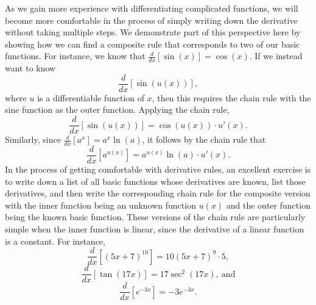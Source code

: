 As we gain more experience with differentiating complicated functions, we will become more comfortable in the process of simply writing down the derivative without taking multiple steps.  We demonstrate part of this perspective here by showing how we can find a composite rule that corresponds to two of our basic functions.  For instance, we know that $\frac{d}{dx}[\sin(x)] = \cos(x)$.  If we instead want to know
$$\frac{d}{dx}[\sin(u(x))],$$
where $u$ is a differentiable function of $x$, then this requires the chain rule with the sine function as the outer function.  Applying the chain rule,
$$\frac{d}{dx}[\sin(u(x))] = \cos(u(x)) \cdot u'(x).$$
Similarly, since $\frac{d}{dx}[a^x] = a^x \ln(a)$, it follows by the chain rule that 
$$\frac{d}{dx}[a^{u(x)}] = a^{u(x)} \ln(a) \cdot u'(x).$$
In the process of getting comfortable with derivative rules, an excellent exercise is to write down a list of all basic functions whose derivatives are known, list those derivatives, and then write the corresponding chain rule for the composite version with the inner function being an unknown function $u(x)$ and the outer function being the known basic function.  These versions of the chain rule are particularly simple when the inner function is linear, since the derivative of a linear function is a constant.  For instance,
$$\frac{d}{dx} \left[ (5x+7)^{10} \right] = 10(5x+7)^9 \cdot 5,$$
$$\frac{d}{dx} \left[ \tan(17x) \right] = 17\sec^2(17x), \ \mbox{and}$$
$$\frac{d}{dx} \left[ e^{-3x} \right] = -3e^{-3x}.$$


